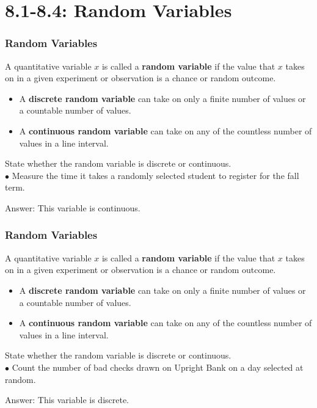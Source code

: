 \documentclass[Lecture.tex]{subfiles}
\begin{document}
\section{8.1-8.4: Random Variables}

\begin{frame}
\frametitle{Random Variables}\pause
\begin{definition}
A quantitative variable $x$ is called a \textbf{random variable} if the value that $x$ takes on in a given experiment or observation is a chance or random outcome.\pause
\begin{itemize}
\item A \textbf{discrete random variable} can take on only a finite number of values or a countable number of values.\pause
\item A \textbf{continuous random variable} can take on any of the countless number of values in a line interval.
\end{itemize}
\end{definition}\pause
\begin{example}
State whether the random variable is discrete or continuous.\\ \pause
 {$\bullet$} Measure the time it takes a randomly selected student to register for the fall term.\pause
\begin{flushright}Answer: This variable is continuous.\end{flushright}
\end{example}
\end{frame}

\begin{frame}
\frametitle{Random Variables}
\begin{definition}
A quantitative variable $x$ is called a \textbf{random variable} if the value that $x$ takes on in a given experiment or observation is a chance or random outcome.
\begin{itemize}
\item A \textbf{discrete random variable} can take on only a finite number of values or a countable number of values.
\item A \textbf{continuous random variable} can take on any of the countless number of values in a line interval.
\end{itemize}
\end{definition}
\begin{example}
State whether the random variable is discrete or continuous.\\ \pause
 {$\bullet$} Count the number of bad checks drawn on Upright Bank on a day selected at random.\pause
\begin{flushright}Answer: This variable is discrete.\end{flushright}
\end{example}
\end{frame}
\end{document}
